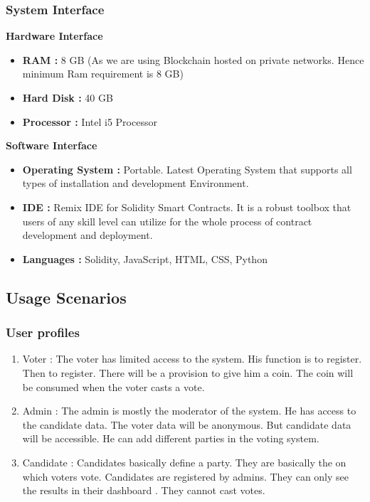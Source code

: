 \documentclass[oneside, 12pt]{book}
\begin{document}
			\subsubsection{System Interface}
				\textbf{Hardware Interface}
					\begin{itemize}
						\item\textbf{RAM :} 8 GB (As we are using Blockchain hosted on private networks. Hence  minimum Ram requirement is 8 GB)
						\item\textbf{Hard Disk :} 40 GB
						\item\textbf{Processor :} Intel i5 Processor
					\end{itemize}
				\textbf{Software Interface}
					\begin{itemize}
						\item\textbf{Operating System :} Portable. Latest Operating System that supports all types of installation and development Environment.
						\item\textbf{IDE :} Remix IDE for Solidity Smart Contracts. It is a robust toolbox that users of any skill level can utilize for the whole process of contract development and deployment. 
						\item\textbf{Languages :} Solidity, JavaScript, HTML, CSS, Python
					\end{itemize}
		\subsection{Usage Scenarios}
			\subsubsection{User profiles}
				\begin{enumerate}
					\item Voter : The voter has limited access to the system. His function is to register. Then to register. There will be a provision to give him a coin. The coin will be consumed when the voter casts a vote. 
					\item Admin : The admin is mostly the moderator of the system. He has access to the candidate data. The voter data will be anonymous. But candidate data will be accessible. He can add different parties in the voting system.
					\item Candidate : Candidates basically define a party. They are basically the on which voters vote. Candidates are registered by admins. They can only see the results in their dashboard . They cannot cast votes.
				\end{enumerate}
\end{document}
